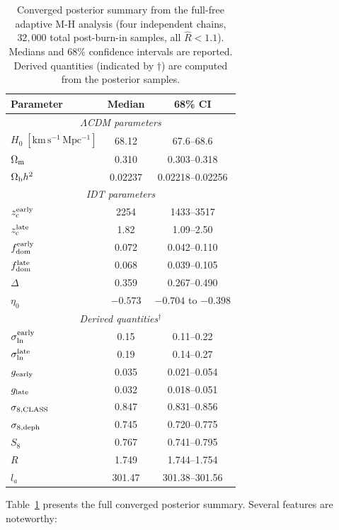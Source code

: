 \documentclass[aps,prd,twocolumn,superscriptaddress,nofootinbib]{revtex4-2}
\newcommand{\Om}{\Omega_{\rm m}}
\newcommand{\Ob}{\Omega_{\rm b}}
\newcommand{\fdom}{f_{\rm dom}}
\newcommand{\zc}{z_{\rm c}}
\newcommand{\sln}{\sigma_{\ln}}
\newcommand{\Hubble}{H_0}
\newcommand{\gearly}{g_{\rm early}}
\newcommand{\glate}{g_{\rm late}}
\newcommand{\etaz}{\eta_0}
\newcommand{\Rhat}{\hat{R}}
\begin{document}
\begin{table}[t]
\centering
\caption{Converged posterior summary from the full-free adaptive M-H
  analysis (four independent chains, $32{,}000$ total post-burn-in
  samples, all $\Rhat < 1.1$). Medians and $68\%$ confidence intervals
  are reported. Derived quantities (indicated by $\dagger$) are
  computed from the posterior samples.}
\label{tab:posteriors}
\begin{ruledtabular}
\begin{tabular}{lcc}
Parameter & Median & 68\% CI \\
\hline
\multicolumn{3}{c}{\textit{$\Lambda$CDM parameters}} \\
$\Hubble\;\mathrm{[km\,s^{-1}\,Mpc^{-1}]}$ & 68.12 & 67.6--68.6 \\
$\Om$ & 0.310 & 0.303--0.318 \\
$\Ob h^2$ & 0.02237 & 0.02218--0.02256 \\
\hline
\multicolumn{3}{c}{\textit{IDT parameters}} \\
$\zc^{\rm early}$ & 2254 & 1433--3517 \\
$\zc^{\rm late}$ & 1.82 & 1.09--2.50 \\
$\fdom^{\rm early}$ & 0.072 & 0.042--0.110 \\
$\fdom^{\rm late}$ & 0.068 & 0.039--0.105 \\
$\Delta$ & 0.359 & 0.267--0.490 \\
$\etaz$ & $-0.573$ & $-0.704$ to $-0.398$ \\
\hline
\multicolumn{3}{c}{\textit{Derived quantities}$^\dagger$} \\
$\sln^{\rm early}$ & 0.15 & 0.11--0.22 \\
$\sln^{\rm late}$ & 0.19 & 0.14--0.27 \\
$\gearly$ & 0.035 & 0.021--0.054 \\
$\glate$ & 0.032 & 0.018--0.051 \\
$\sigma_{8,\rm CLASS}$ & 0.847 & 0.831--0.856 \\
$\sigma_{8,\rm deph}$ & 0.745 & 0.720--0.775 \\
$S_8$ & 0.767 & 0.741--0.795 \\
$R$ & 1.749 & 1.744--1.754 \\
$l_a$ & 301.47 & 301.38--301.56 \\
\end{tabular}
\end{ruledtabular}
\end{table}

Table~\ref{tab:posteriors} presents the full converged posterior
summary. Several features are noteworthy:
\end{document}
